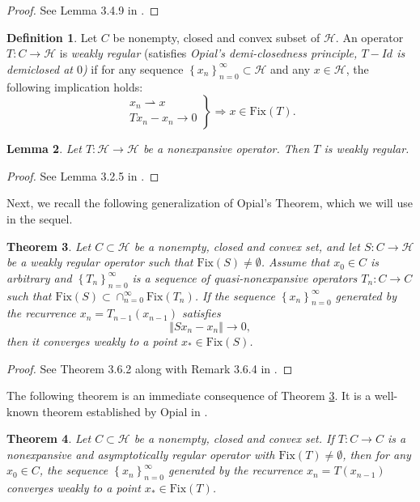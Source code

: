 \documentclass[]{interact}
\theoremstyle{plain}%
\newtheorem{theorem}{Theorem}[section]
\newtheorem{lemma}[theorem]{Lemma}
\theoremstyle{definition}
\newtheorem{definition}[theorem]{Definition}
\theoremstyle{remark}
\begin{document}
\begin{proof}
See Lemma 3.4.9 in \cite{key-11}.
\end{proof}
\begin{definition}
\label{demi-closed operator}Let $C$ be nonempty, closed and convex
subset of $\mathcal{H}$. An operator $T:C\rightarrow\mathcal{H}$
is \textit{weakly regular} (satisfies \textit{Opial's demi-closedness
principle, $T-Id$ is demiclosed at $0$)} if for any sequence $\left\{ x_{n}\right\} _{n=0}^{\infty}\subset\mathcal{H}$
and any $x\in\mathcal{H}$, the following implication holds:
\vspace{-.2cm}
\[
\left.\begin{array}{l}
x_{n}\rightharpoonup x\\
Tx_{n}-x_{n}\rightarrow0
\end{array}\right\} \Longrightarrow x\in\mathrm{Fix}(T).
\]
\end{definition}
\begin{lemma}
\label{Nonexpansive is weakly regular} Let $T:\mathcal{H}\rightarrow\mathcal{H}$
be a nonexpansive operator. Then $T$ is weakly regular.
\end{lemma}
\begin{proof}
See Lemma 3.2.5 in \cite{key-11}.
\end{proof}
Next, we recall the following generalization of Opial's Theorem, which
we will use in the sequel.
\begin{theorem}
\label{GenOpial}Let $C\subset\mathcal{H}$ be a nonempty, closed
and convex set, and let $S:C\rightarrow\mathcal{H}$ be a weakly regular
operator such that $\mathrm{Fix}\left(S\right)\not=\emptyset$. Assume
that $x_{0}\in C$ is arbitrary and $\left\{ T_{n}\right\} _{n=0}^{\infty}$
is a sequence of quasi-nonexpansive operators $T_{n}:C\rightarrow C$
such that $\mathrm{Fix}\left(S\right)\subset\cap_{n=0}^{\infty}\mathrm{Fix}(T_{n})$.
If the sequence $\left\{ x_{n}\right\} _{n=0}^{\infty}$ generated
by the recurrence $x_{n}=T_{n-1}\left(x_{n-1}\right)$ satisfies
\[
\left\Vert Sx_{n}-x_{n}\right\Vert \rightarrow0,
\]
then it converges weakly to a point $x_{*}\in\mathrm{Fix}\left(S\right)$.
\end{theorem}
\begin{proof}
See Theorem 3.6.2 along with Remark 3.6.4 in \cite{key-11}.
\end{proof}
The following theorem is an immediate consequence of Theorem \ref{GenOpial}.
It is a well-known theorem established by Opial in \cite{key-18}.
\begin{theorem}
\label{Opial}Let $C\subset\mathcal{H}$ be a nonempty, closed and
convex set. If $T:C\rightarrow C$ is a nonexpansive and asymptotically
regular operator with $\mathrm{Fix}\left(T\right)\not=\emptyset$,
then for any $x_{0}\in C$, the sequence $\left\{ x_{n}\right\} _{n=0}^{\infty}$
generated by the recurrence $x_{n}=T\left(x_{n-1}\right)$ converges
weakly to a point $x_{*}\in\mathrm{Fix}\left(T\right)$.
\end{theorem}
\end{document}
